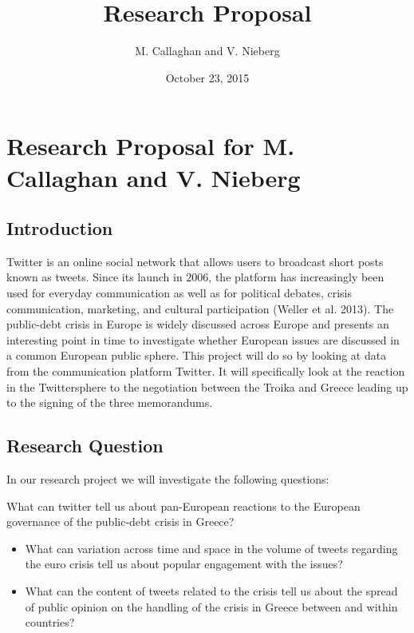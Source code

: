 \documentclass[]{article}
\title{Research Proposal}
\author{M. Callaghan and V. Nieberg}
\date{October 23, 2015}
\begin{document}
\maketitle


\section{Research Proposal for M. Callaghan and V.
Nieberg}\label{research-proposal-for-m.-callaghan-and-v.-nieberg}

\subsection{Introduction}\label{introduction}

Twitter is an online social network that allows users to broadcast short
posts known as tweets. Since its launch in 2006, the platform has
increasingly been used for everyday communication as well as for
political debates, crisis communication, marketing, and cultural
participation (Weller et al. 2013). The public-debt crisis in Europe is
widely discussed across Europe and presents an interesting point in time
to investigate whether European issues are discussed in a common
European public sphere. This project will do so by looking at data from
the communication platform Twitter. It will specifically look at the
reaction in the Twittersphere to the negotiation between the Troika and
Greece leading up to the signing of the three memorandums.

\subsection{Research Question}\label{research-question}

In our research project we will investigate the following questions:

What can twitter tell us about pan-European reactions to the European
governance of the public-debt crisis in Greece?

\begin{itemize}
\item
  What can variation across time and space in the volume of tweets
  regarding the euro crisis tell us about popular engagement with the
  issues?
\item
  What can the content of tweets related to the crisis tell us about the
  spread of public opinion on the handling of the crisis in Greece
  between and within countries?
\end{itemize}
\end{document}
